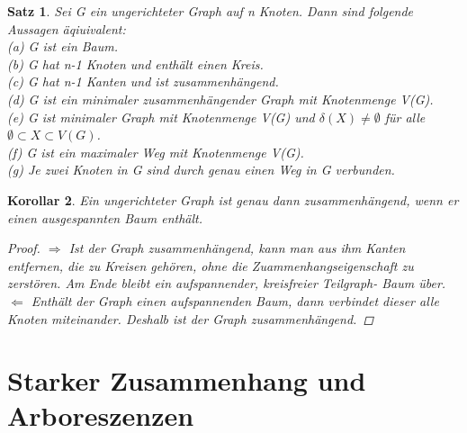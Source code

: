 \documentclass{beamer}
\newtheorem{satz}{Satz}
\newtheorem{korollar}[satz]{Korollar}
\begin{document}
  \begin{frame}
  \vfill
    \begin{center}
      \begin{satz} 
        Sei G ein ungerichteter Graph auf n Knoten.
       Dann sind folgende Aussagen äqiuivalent:\\
        (a) G ist ein Baum.\\
        (b) G hat n-1 Knoten und enthält einen Kreis.\\
        (c) G hat n-1 Kanten und ist zusammenhängend.\\
        (d) G ist ein minimaler zusammenhängender Graph mit Knotenmenge V(G).\\
        (e) G ist minimaler Graph mit Knotenmenge V(G) und $\delta (X) \neq \emptyset$ für alle $\emptyset \subset X\subset V(G)$.\\
        (f) G ist ein maximaler Weg mit Knotenmenge V(G).\\
        (g) Je zwei Knoten in G sind durch genau einen Weg in G verbunden.\\
      \end{satz}
    \end{center}
  \vfill
  \end{frame}

  \begin{frame}
  \vfill
    \begin{center}
     \begin{korollar} 
        Ein ungerichteter Graph ist genau dann zusammenhängend, wenn er einen ausgespannten Baum enthält.
        \begin {proof}
         $\Rightarrow$ Ist der Graph zusammenhängend, kann man aus ihm Kanten entfernen, die zu Kreisen gehören, ohne die Zuammenhangseigenschaft zu zerstören.
         Am Ende bleibt ein aufspannender, kreisfreier Teilgraph- Baum über.\\
         $\Leftarrow$ Enthält der Graph einen aufspannenden Baum, dann verbindet dieser alle Knoten miteinander. Deshalb ist der Graph zusammenhängend.
        \end {proof}
      \end{korollar}  
    \end{center}
  \vfill
  \end{frame}

\section{Starker Zusammenhang und Arboreszenzen}
\end{document}
